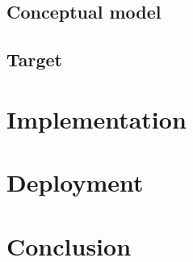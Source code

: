\documentclass[oneside]{book}
\begin{document}
    \newpage

    \section{Conceptual model}\label{sec:conceptual-model}
    

    \section{Target}\label{sec:target-comp}
    

    \chapter{Implementation}\label{sec:implementation}
    

    \chapter{Deployment}\label{sec:deployment}
    

    \chapter{Conclusion}\label{sec:conclusion}

    \printbibliography[title=References]

    \appendix
\end{document}
